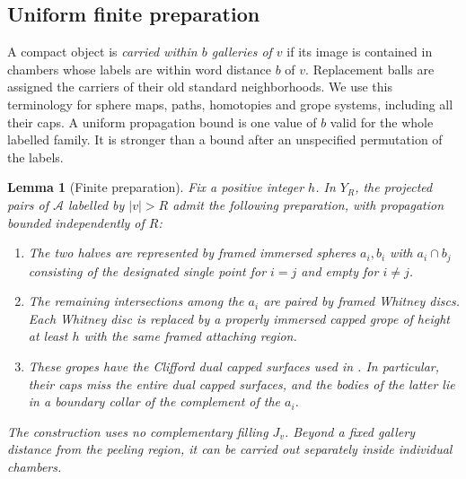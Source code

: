 \documentclass[11pt]{article}
\newtheorem{lemma}[theorem]{Lemma}
\theoremstyle{definition}
\theoremstyle{remark}
\begin{document}
\subsection{Uniform finite preparation}

A compact object is \emph{carried within $b$ galleries of $v$} if its
image is contained in chambers whose labels are within word distance
$b$ of $v$.  Replacement balls are assigned the carriers of their old
standard neighborhoods.  We use this terminology for sphere maps,
paths, homotopies and grope systems, including all their caps.  A
uniform propagation bound is one value of $b$ valid for the whole
labelled family.  It is stronger than a bound after an unspecified
permutation of the labels.

\begin{lemma}[Finite preparation]\label{ct:preparation}
Fix a positive integer $h$.  In $Y_R$, the projected pairs of
$\mathcal A$ labelled by $|v|>R$ admit the following preparation, with
propagation bounded independently of $R$:
\begin{enumerate}
\item The two halves are represented by framed immersed spheres
      $a_i,b_i$ with $a_i\cap b_j$ consisting of the designated single
      point for $i=j$ and empty for $i\ne j$.
\item The remaining intersections among the $a_i$ are paired by
      framed Whitney discs.  Each Whitney disc is replaced by a
      properly immersed capped grope of height at least $h$ with the
      same framed attaching region.
\item These gropes have the Clifford dual capped surfaces used in
      \cite[Definition~3.1 and Lemma~4.1]{PRT}.  In particular, their
      caps miss the \emph{entire} dual capped surfaces, and the bodies
      of the latter lie in a boundary collar of the complement of the
      $a_i$.
\end{enumerate}
The construction uses no complementary filling $J_v$.  Beyond a fixed
gallery distance from the peeling region, it can be carried out
separately inside individual chambers.
\end{lemma}
\end{document}
